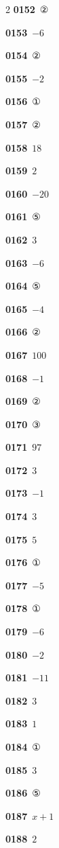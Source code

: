 \documentclass[10pt,a4paper]{article}
\begin{document}
\begin{multicols}{2}
\noindent\textbf{0152}\ ②\par
\noindent\textbf{0153}\ $-6$\par
\noindent\textbf{0154}\ ②\par
\noindent\textbf{0155}\ $-2$\par
\noindent\textbf{0156}\ ①\par
\noindent\textbf{0157}\ ②\par
\noindent\textbf{0158}\ $18$\par
\noindent\textbf{0159}\ $2$\par
\noindent\textbf{0160}\ $-20$\par
\noindent\textbf{0161}\ ⑤\par
\noindent\textbf{0162}\ $3$\par
\noindent\textbf{0163}\ $-6$\par
\noindent\textbf{0164}\ ⑤\par
\noindent\textbf{0165}\ $-4$\par
\noindent\textbf{0166}\ ②\par
\noindent\textbf{0167}\ $100$\par
\noindent\textbf{0168}\ $-1$\par
\noindent\textbf{0169}\ ②\par
\noindent\textbf{0170}\ ③\par
\noindent\textbf{0171}\ $97$\par
\noindent\textbf{0172}\ $3$\par
\noindent\textbf{0173}\ $-1$\par
\noindent\textbf{0174}\ $3$\par
\noindent\textbf{0175}\ $5$\par
\noindent\textbf{0176}\ ①\par
\noindent\textbf{0177}\ $-5$\par
\noindent\textbf{0178}\ ①\par
\noindent\textbf{0179}\ $-6$\par
\noindent\textbf{0180}\ $-2$\par
\noindent\textbf{0181}\ $-11$\par
\noindent\textbf{0182}\ $3$\par
\noindent\textbf{0183}\ $1$\par
\noindent\textbf{0184}\ ①\par
\noindent\textbf{0185}\ $3$\par
\noindent\textbf{0186}\ ⑤\par
\noindent\textbf{0187}\ $x+1$\par
\noindent\textbf{0188}\ $2$\par

\end{multicols}
\end{document}
